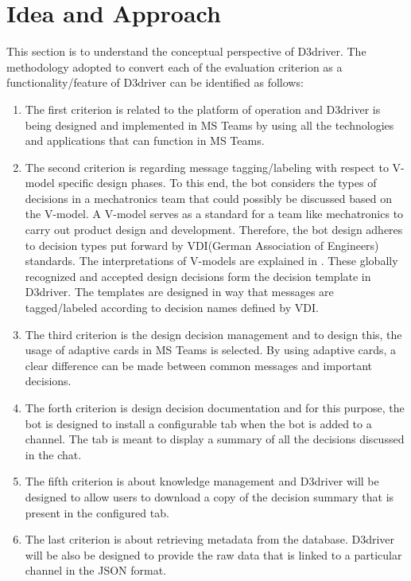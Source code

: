 \section{Idea and Approach}
\label{iaA}
This section is to understand the conceptual perspective of D3driver. The methodology adopted to convert each of the evaluation criterion as a functionality/feature of D3driver can be identified as follows: 
\begin{enumerate}
\item The first criterion is related to the platform of operation and D3driver is being designed and implemented in MS Teams by using all the technologies and applications that can function in MS Teams.

\item The second criterion is regarding message tagging/labeling with respect to V-model specific design phases. To this end, the bot considers the types of decisions in a mechatronics team that could possibly be discussed based on the V-model. A V-model serves as a standard for a team like mechatronics to carry out product design and development. Therefore, the bot design adheres to decision types put forward by VDI(German Association of Engineers) standards. The interpretations of V-models are explained in \cite{grassler2018v}. These globally recognized and accepted design decisions form the decision template in D3driver. The templates are designed in way that messages are tagged/labeled according to decision names defined by VDI.

\item The third criterion is the design decision management and to design this, the usage of adaptive cards in MS Teams is selected. By using adaptive cards, a clear difference can be made between common messages and important decisions.

\item The forth criterion is design decision documentation and for this purpose, the bot is designed to install a configurable tab when the bot is added to a channel. The tab is meant to display a summary of all the decisions discussed in the chat. 

\item The fifth criterion is about knowledge management and D3driver will be designed to allow users to download a copy of the decision summary that is present in the configured tab. 

\item The last criterion is about retrieving metadata from the database. D3driver will be also be designed to provide the raw data that is linked to a particular channel in the JSON format.
\end{enumerate}


